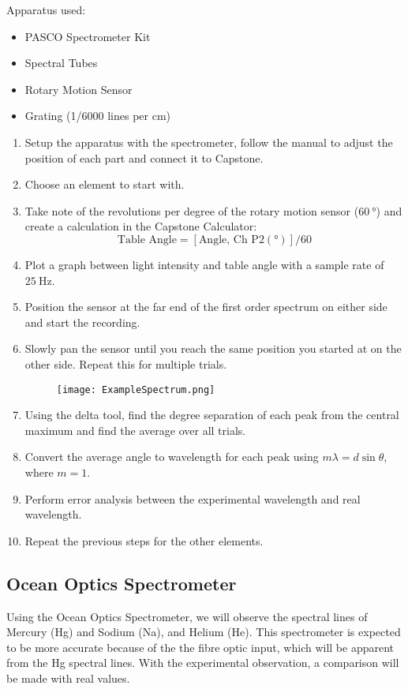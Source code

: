 \documentclass[12pt]{article}
\begin{document}
	Apparatus used:
	\begin{itemize}
		\item PASCO Spectrometer Kit
		\item Spectral Tubes
		\item Rotary Motion Sensor
		\item Grating (1/6000 lines per cm)
	\end{itemize}
	\begin{enumerate}
		\item Setup the apparatus with the spectrometer, follow the manual to adjust the position of each part and connect it to Capstone.
		\item Choose an element to start with.
		\item Take note of the revolutions per degree of the rotary motion sensor ($\qty{60}{\degree}$) and create a calculation in the Capstone Calculator:
		\[
			\text{Table Angle} = \left[ \text{Angle, Ch P}2 (\unit{\degree}) \right]/60
		\]
		\item Plot a graph between light intensity and table angle with a sample rate of $\qty{25}{\hertz}$.
		\item Position the sensor at the far end of the first order spectrum on either side and start the recording.
		\item Slowly pan the sensor until you reach the same position you started at on the other side. Repeat this for multiple trials.
		\begin{figure}[!h]
			\centering
			\label{ExampleSpectrum}
			\texttt{[image: ExampleSpectrum.png]}
		\end{figure}
		\item Using the delta tool, find the degree separation of each peak from the central maximum and find the average over all trials.
		\item Convert the average angle to wavelength for each peak using $m\lambda = d \sin \theta$, where $m=1$.
		\item Perform error analysis between the experimental wavelength and real wavelength.
		\item Repeat the previous steps for the other elements.
	\end{enumerate}
	
	\subsection{Ocean Optics Spectrometer}

	Using the Ocean Optics Spectrometer, we will observe the spectral lines of Mercury (Hg) and Sodium (Na), and Helium (He). This spectrometer is expected to be more accurate because of the the fibre optic input, which will be apparent from the Hg spectral lines. With the experimental observation, a comparison will be made with real values.
	
\end{document}
